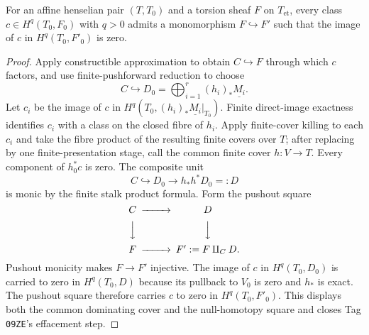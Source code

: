 \begin{lemma}
\label{lemma:weil-pbc-gabber-effacement}
\uses{}

For an affine henselian pair $(T,T_0)$ and a torsion sheaf $F$ on $T_{\mathrm{et}}$,
every class $c\in H^q(T_0,F_0)$ with $q>0$ admits a monomorphism
$F\hookrightarrow F'$ such that the image of $c$ in $H^q(T_0,F'_0)$ is zero.
\end{lemma}
\begin{proof}

Apply constructible approximation to obtain $C\hookrightarrow F$ through
which $c$ factors, and use finite-pushforward reduction to choose
\[
 C\hookrightarrow D_0=\bigoplus_{i=1}^r(h_i)_*\underline{M_i}.
\]
Let $c_i$ be the image of $c$ in
$H^q(T_0,(h_i)_*\underline{M_i}|_{T_0})$.  Finite direct-image exactness
identifies $c_i$ with a class on the closed fibre of $h_i$.  Apply finite-cover
killing to each $c_i$ and take the fibre product of the resulting finite
covers over $T$; after replacing by one finite-presentation stage, call the
common finite cover $h:V\to T$.  Every component of $h_0^*c$ is zero.
The composite unit
\[
 C\hookrightarrow D_0\longrightarrow h_*h^*D_0=:D
\]
is monic by the finite stalk product formula.  Form the pushout square
\[
\begin{CD}
 C @>>> D\\
 @VVV @VVV\\
 F @>>> F':=F\amalg_C D.
\end{CD}
\]
Pushout monicity makes $F\to F'$ injective.  The image of $c$ in
$H^q(T_0,D_0)$ is carried to zero in $H^q(T_0,D)$ because its pullback to
$V_0$ is zero and $h_*$ is exact.  The pushout square therefore carries $c$
to zero in $H^q(T_0,F'_0)$.  This displays both the common dominating cover
and the null-homotopy square and closes Tag \texttt{09ZE}'s effacement step.
\end{proof}

